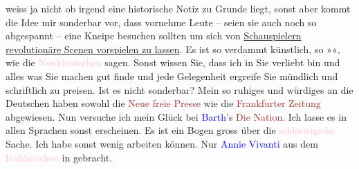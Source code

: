                weiss ja nicht ob irgend eine historische Notiz zu Grunde liegt, sonst aber kommt die
               Idee mir sonderbar vor, dass vornehme Leute – seien sie auch noch so abgespannt –
               eine Kneipe besuchen sollten um sich von \uline{Schauspielern
                  revolutionäre Scenen vorspielen zu lassen}. Es ist so verdammt künstlich, so
                  »\label{K_L00905_1v}\label{K_L00905_1h}«, wie die \textcolor{pink}{Norddeutschen}{}\ledrightnote{\textcolor{pink}{Deutschland}}
               sagen.\pend
           \pstart
           Sonst wissen Sie, dass ich in Sie verliebt bin und alles was Sie machen {\pb}gut finde und jede Gelegenheit
               ergreife Sie mündlich und schriftlich zu preisen.\pend
           \pstart
           Ist es nicht sonderbar? Mein so ruhiges und würdiges \label{K_L00905_2v}\label{K_L00905_2h} an die Deutschen haben sowohl die \textcolor{brown}{Neue freie
                  Presse}{}\ledrightnote{\textcolor{brown}{Neue Freie Presse}} wie die \textcolor{brown}{Frankfurter Zeitung}{}\ledrightnote{\textcolor{brown}{Frankfurter Zeitung}}
               abgewiesen. Nun versuche ich mein Glück bei \textcolor{blue}{Barth}{}\ledrightnote{\textcolor{blue}{Theodor Barth}}’s \textcolor{brown}{Die Nation}{}\ledrightnote{\textcolor{brown}{Die Nation}}. Ich lasse es in allen
               Sprachen sonst erscheinen. Es ist ein Bogen gross über die \textcolor{pink}{schleswigsche}{}\ledrightnote{\textcolor{pink}{Südschleswig}} Sache.\pend
           \pstart
           Ich habe sonst wenig arbeiten können. Nur \textcolor{blue}{Annie
                  Vivanti}{}\ledrightnote{\textcolor{blue}{Annie Vivanti}} aus dem \textcolor{pink}{Italiänischen}{}\ledrightnote{\textcolor{pink}{Italien}} in \label{K_L00905_3v}\label{K_L00905_3h} gebracht.\pend
